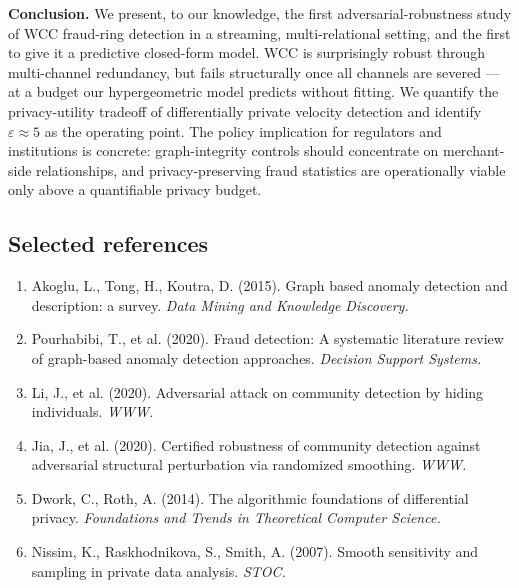 \documentclass[12pt,a4paper]{article}
\begin{document}
\textbf{Conclusion.} We present, to our knowledge, the first
adversarial-robustness study of WCC fraud-ring detection in a streaming,
multi-relational setting, and the first to give it a predictive closed-form
model. WCC is surprisingly robust through multi-channel redundancy, but fails
structurally once all channels are severed --- at a budget our hypergeometric
model predicts without fitting. We quantify the privacy-utility tradeoff of
differentially private velocity detection and identify $\varepsilon \approx 5$
as the operating point. The policy implication for regulators and institutions
is concrete: graph-integrity controls should concentrate on merchant-side
relationships, and privacy-preserving fraud statistics are operationally viable
only above a quantifiable privacy budget.

\subsection*{Selected references}

\begin{enumerate}\setlength{\itemsep}{0pt}
  \item Akoglu, L., Tong, H., Koutra, D. (2015). Graph based anomaly detection
        and description: a survey. \textit{Data Mining and Knowledge Discovery.}
  \item Pourhabibi, T., et al. (2020). Fraud detection: A systematic literature
        review of graph-based anomaly detection approaches.
        \textit{Decision Support Systems.}
  \item Li, J., et al. (2020). Adversarial attack on community detection by
        hiding individuals. \textit{WWW.}
  \item Jia, J., et al. (2020). Certified robustness of community detection
        against adversarial structural perturbation via randomized smoothing.
        \textit{WWW.}
  \item Dwork, C., Roth, A. (2014). The algorithmic foundations of differential
        privacy. \textit{Foundations and Trends in Theoretical Computer Science.}
  \item Nissim, K., Raskhodnikova, S., Smith, A. (2007). Smooth sensitivity and
        sampling in private data analysis. \textit{STOC.}
\end{enumerate}
\end{document}
